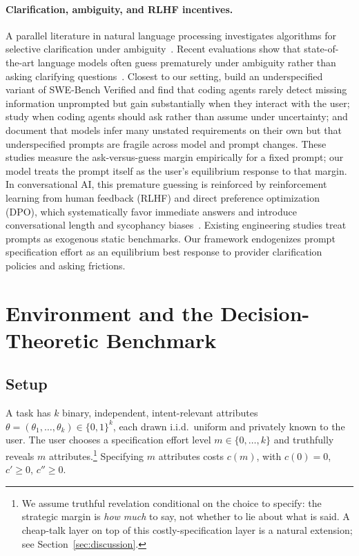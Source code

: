 \documentclass[11pt]{article}
\begin{document}
\paragraph{Clarification, ambiguity, and RLHF incentives.}
A parallel literature in natural language processing investigates algorithms for selective clarification under ambiguity~\citep{rao-daume2018,aliannejadi2019,zamani2020,min2020,kuhn2023}. Recent evaluations show that state-of-the-art language models often guess prematurely under ambiguity rather than asking clarifying questions~\citep{laban2025}. Closest to our setting, \citet{vijayvargiya2025} build an underspecified variant of SWE-Bench Verified and find that coding agents rarely detect missing information unprompted but gain substantially when they interact with the user; \citet{edwards-schuster2026} study when coding agents should ask rather than assume under uncertainty; and \citet{yang2025} document that models infer many unstated requirements on their own but that underspecified prompts are fragile across model and prompt changes. These studies measure the ask-versus-guess margin empirically for a fixed prompt; our model treats the prompt itself as the user's equilibrium response to that margin. In conversational AI, this premature guessing is reinforced by reinforcement learning from human feedback (RLHF) and direct preference optimization (DPO), which systematically favor immediate answers and introduce conversational length and sycophancy biases~\citep{sharma2023,singhal2023}. Existing engineering studies treat prompts as exogenous static benchmarks. Our framework endogenizes prompt specification effort as an equilibrium best response to provider clarification policies and asking frictions.

\section{Environment and the Decision-Theoretic Benchmark}
\label{sec:baseline}

\subsection{Setup}

A task has $k$ binary, independent, intent-relevant attributes
$\theta = (\theta_1,\dots,\theta_k) \in \{0,1\}^k$, each drawn i.i.d.\ uniform and
privately known to the user. The user chooses a specification effort level
$m \in \{0,\dots,k\}$ and truthfully reveals $m$ attributes.\footnote{We assume
truthful revelation conditional on the choice to specify: the strategic margin is
\emph{how much} to say, not whether to lie about what is said. A cheap-talk layer
on top of this costly-specification layer is a natural extension; see
Section~\ref{sec:discussion}.} Specifying $m$ attributes costs $c(m)$, with
$c(0)=0$, $c' \ge 0$, $c'' \ge 0$.
\end{document}
